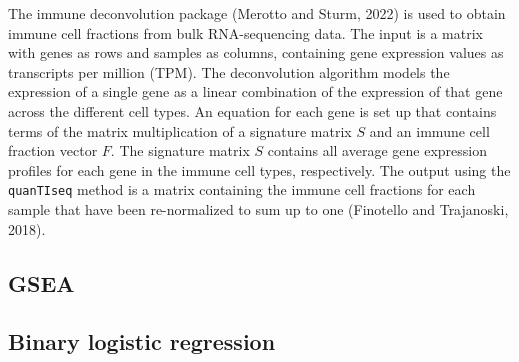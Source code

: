\documentclass[
  parskip,
  oneside]{scrreprt}
\begin{document}
The immune deconvolution package (Merotto and Sturm, 2022) is used to
obtain immune cell fractions from bulk RNA-sequencing data. The input is
a matrix with genes as rows and samples as columns, containing gene
expression values as transcripts per million (TPM). The deconvolution
algorithm models the expression of a single gene as a linear combination
of the expression of that gene across the different cell types. An
equation for each gene is set up that contains terms of the matrix
multiplication of a signature matrix \(S\) and an immune cell fraction
vector \(F\). The signature matrix \(S\) contains all average gene
expression profiles for each gene in the immune cell types,
respectively. The output using the \texttt{quanTIseq} method is a matrix
containing the immune cell fractions for each sample that have been
re-normalized to sum up to one (Finotello and Trajanoski, 2018).

\hypertarget{gsea}{%
\subsection{GSEA}\label{gsea}}

\hypertarget{binary-logistic-regression}{%
\subsection{Binary logistic
regression}\label{binary-logistic-regression}}
\end{document}
